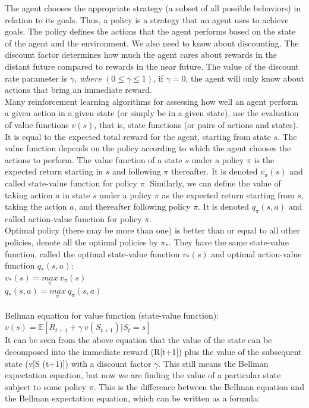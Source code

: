 \documentclass[a4paper, twoside, english]{article}
\begin{document}
The agent chooses the appropriate strategy (a subset of all possible behaviors) in relation to its goals. Thus, a policy is a strategy that an agent uses to achieve goals. The policy defines the actions that the agent performs based on the state of the agent and the environment. We also need to know about discounting. The discount factor determines how much the agent cares about rewards in the distant future compared to rewards in the near future. The value of the discount rate parameter is $\gamma, \ where \ (0 \leq \gamma \leq 1)$, if $\gamma=0$, the agent will only know about actions that bring an immediate reward. ~\cite{MPD2}\\
Many reinforcement learning algorithms for assessing how well an agent perform a given action in a given state (or simply be in a given state), use the evaluation of value functions $v(s)$, that is, state functions (or pairs of actions and states). It is equal to the expected total reward for the agent, starting from state $s$. The value function depends on the policy according to which the agent chooses the actions to perform. The value function of a state $s$ under a policy $\pi$ is the expected return starting in $s$ and following $\pi$ thereafter. It is denoted $v_\pi(s)$ and called state-value function for policy $\pi$. Similarly, we can define the value of taking action $a$ in state $s$ under a policy $\pi$ as the expected return starting from $s$, taking the action $a$, and thereafter following policy $\pi$. It is denoted $q_\pi(s, a)$ and called action-value function for policy $\pi$.\\
Optimal policy (there may be more than one) is better than or equal to all other policies, denote all the optimal policies by $\pi_*$. 
They have the same state-value function, called the optimal state-value function $v_*(s)$ and optimal action-value function $q_*(s, a)$:  ~\cite{MPD2}\\
$v_*(s)= \underset{\pi}{max} \ v_\pi(s)$\\
$q_*(s, a) = \underset{\pi}{max} \ q_\pi(s, a)$
~\\
~\\
Bellman equation for value function (state-value function): ~\cite{MPD}\\
 $v(s) = \mathbb{E}[R_{t+1}+\gamma \ v(S_{t+1})|S_t=s]$\\
It can be seen from the above equation that the value of the state can be decomposed into the immediate reward (R[t+1]) plus the value of the subsequent state (v[S (t+1)]) with a discount factor $\gamma$. This still means the Bellman expectation equation, but now we are finding the value of a particular state subject to some policy $\pi$. This is the difference between the Bellman equation and the Bellman expectation equation, which can be written as a formula:\\
\end{document}
